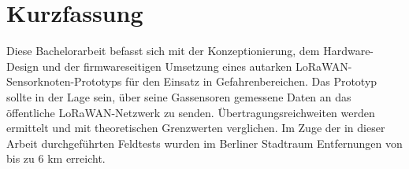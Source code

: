 

\section*{Kurzfassung}
Diese Bachelorarbeit befasst sich mit der Konzeptionierung, dem Hardware-Design und der firmwareseitigen Umsetzung 
eines autarken LoRaWAN-Sensorknoten-Prototyps für den Einsatz in Gefahrenbereichen. Das Prototyp sollte in der Lage sein, 
über seine Gassensoren gemessene Daten an das öffentliche LoRaWAN-Netzwerk zu senden. Übertragungsreichweiten werden ermittelt 
und mit theoretischen Grenzwerten verglichen. Im Zuge der in dieser Arbeit durchgeführten Feldtests wurden im Berliner Stadtraum 
Entfernungen von bis zu 6 km erreicht. 

